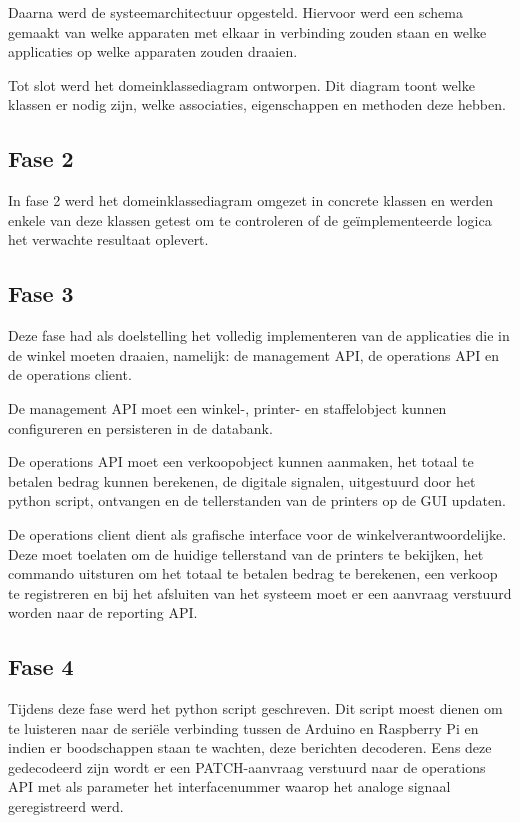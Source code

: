 Daarna werd de systeemarchitectuur opgesteld. Hiervoor werd een schema gemaakt van welke apparaten met elkaar in verbinding zouden staan en welke applicaties op welke apparaten zouden draaien.

Tot slot werd het domeinklassediagram ontworpen. Dit diagram toont welke klassen er nodig zijn, welke associaties, eigenschappen en methoden deze hebben.

\subsection{Fase 2}
In fase 2 werd het domeinklassediagram omgezet in concrete klassen en werden enkele van deze klassen getest om te controleren of de geïmplementeerde logica het verwachte resultaat oplevert.

\subsection{Fase 3}
Deze fase had als doelstelling het volledig implementeren van de applicaties die in de winkel moeten draaien, namelijk: de management API, de operations API en de operations client. 

De management API moet een winkel-, printer- en staffelobject kunnen configureren en persisteren in de databank.

De operations API moet een verkoopobject kunnen aanmaken, het totaal te betalen bedrag kunnen berekenen, de digitale signalen, uitgestuurd door het python script, ontvangen en de tellerstanden van de printers op de GUI updaten.

De operations client dient als grafische interface voor de winkelverantwoordelijke. Deze moet toelaten om de huidige tellerstand van de printers te bekijken, het commando uitsturen om het totaal te betalen bedrag te berekenen, een verkoop te registreren en bij het afsluiten van het systeem moet er een aanvraag verstuurd worden naar de reporting API.

\subsection{Fase 4}
Tijdens deze fase werd het python script geschreven. Dit script moest dienen om te luisteren naar de seriële verbinding tussen de Arduino en Raspberry Pi en indien er boodschappen staan te wachten, deze berichten decoderen. Eens deze gedecodeerd zijn wordt er een PATCH-aanvraag verstuurd naar de operations API met als parameter het interfacenummer waarop het analoge signaal geregistreerd werd.

